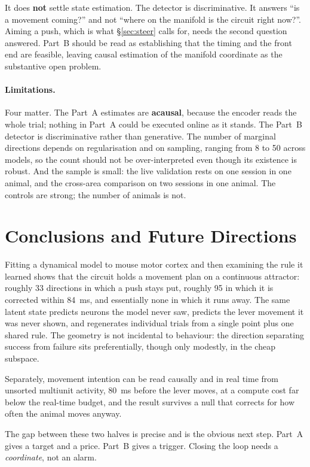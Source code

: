 \documentclass[11pt]{article}
\begin{document}
It does \textbf{not} settle state estimation. The detector is discriminative. It
answers ``is a movement coming?'' and not ``where on the manifold is the circuit
right now?''. Aiming a push, which is what \S\ref{sec:steer} calls for, needs the
second question answered. Part~B should be read as establishing that the timing
and the front end are feasible, leaving causal estimation of the manifold
coordinate as the substantive open problem.

\paragraph{Limitations.} Four matter. The Part~A estimates are \textbf{acausal},
because the encoder reads the whole trial; nothing in Part~A could be executed
online as it stands. The Part~B detector is discriminative rather than
generative. The number of marginal directions depends on regularisation and on
sampling, ranging from 8 to 50 across models, so the count should not be
over-interpreted even though its existence is robust. And the sample is small:
the live validation rests on one session in one animal, and the cross-area
comparison on two sessions in one animal. The controls are strong; the number of
animals is not.

\section{Conclusions and Future Directions}

Fitting a dynamical model to mouse motor cortex and then examining the rule it
learned shows that the circuit holds a movement plan on a continuous attractor:
roughly 33 directions in which a push stays put, roughly 95 in which it is
corrected within 84~ms, and essentially none in which it runs away. The same
latent state predicts neurons the model never saw, predicts the lever movement it
was never shown, and regenerates individual trials from a single point plus one
shared rule. The geometry is not incidental to behaviour: the direction
separating success from failure sits preferentially, though only modestly, in the
cheap subspace.

Separately, movement intention can be read causally and in real time from
unsorted multiunit activity, 80~ms before the lever moves, at a compute cost far
below the real-time budget, and the result survives a null that corrects for how
often the animal moves anyway.

The gap between these two halves is precise and is the obvious next step. Part~A
gives a target and a price. Part~B gives a trigger. Closing the loop needs a
\emph{coordinate}, not an alarm.
\end{document}
